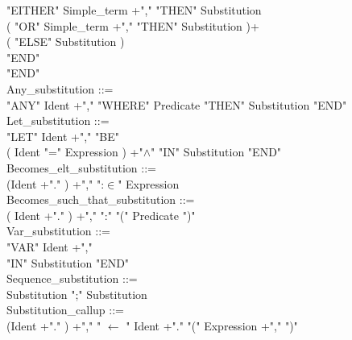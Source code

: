 \documentclass[12pt,a4paper,draft]{article}
\begin{document}
{\begin{sloppypar}
  \hspace*{0.20in}   "EITHER"  Simple\_term +","    "THEN"  Substitution \\ 
  \hspace*{0.20in}  ( "OR"  Simple\_term  +","   "THEN"  Substitution )+\\ 
  \hspace*{0.20in}  ( "ELSE"  Substitution ) \\ %
  \hspace*{0.20in}  "END" \\
  \hspace*{0.20in}  "END" \\ 
Any\_substitution ::= \\ 
  \hspace*{0.20in}  "ANY"  Ident +","   "WHERE"  Predicate  "THEN"  Substitution  "END" \\ 
Let\_substitution ::= \\ 
  \hspace*{0.20in}  "LET"  Ident +","   "BE"\\    ( Ident  "="  Expression ) +"$\land$"   "IN"  Substitution  "END" \\ 
Becomes\_elt\_substitution ::= \\ 
  \hspace*{0.20in}  (Ident +"." ) +"," ":$\in$"  Expression\\ 
Becomes\_such\_that\_substitution ::= \\ 
  \hspace*{0.20in}  ( Ident +"."  ) +","   ":" "(" Predicate ")" \\ 
Var\_substitution ::= \\ 
  \hspace*{0.20in}  "VAR" Ident +","\\ 
  \hspace*{0.20in} "IN" Substitution "END" \\ 
Sequence\_substitution ::= \\ 
  \hspace*{0.20in}   Substitution ";"  Substitution\\ 
Substitution\_callup ::= \\ 
  \hspace*{0.20in}    (Ident +"." ) +","  " $\leftarrow$ "   Ident +"."   "("  Expression +","  ")" \\  %

\end{sloppypar}}
\end{document}
